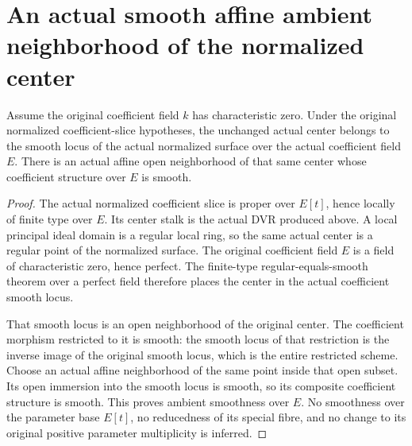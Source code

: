 \section{An actual smooth affine ambient neighborhood of the normalized center}
\begin{theorem}\label{thm:normalized-center-ambient-smooth}
Assume the original coefficient field $k$ has characteristic zero. Under the original normalized coefficient-slice hypotheses, the unchanged actual center belongs to the smooth locus of the actual normalized surface over the actual coefficient field $E$. There is an actual affine open neighborhood of that same center whose coefficient structure over $E$ is smooth.
\leanok
\end{theorem}
\begin{proof}
The actual normalized coefficient slice is proper over $E[t]$, hence locally of finite type over $E$. Its center stalk is the actual DVR produced above. A local principal ideal domain is a regular local ring, so the same actual center is a regular point of the normalized surface. The original coefficient field $E$ is a field of characteristic zero, hence perfect. The finite-type regular-equals-smooth theorem over a perfect field therefore places the center in the actual coefficient smooth locus.

That smooth locus is an open neighborhood of the original center. The coefficient morphism restricted to it is smooth: the smooth locus of that restriction is the inverse image of the original smooth locus, which is the entire restricted scheme. Choose an actual affine neighborhood of the same point inside that open subset. Its open immersion into the smooth locus is smooth, so its composite coefficient structure is smooth. This proves ambient smoothness over $E$. No smoothness over the parameter base $E[t]$, no reducedness of its special fibre, and no change to its original positive parameter multiplicity is inferred.
\end{proof}

